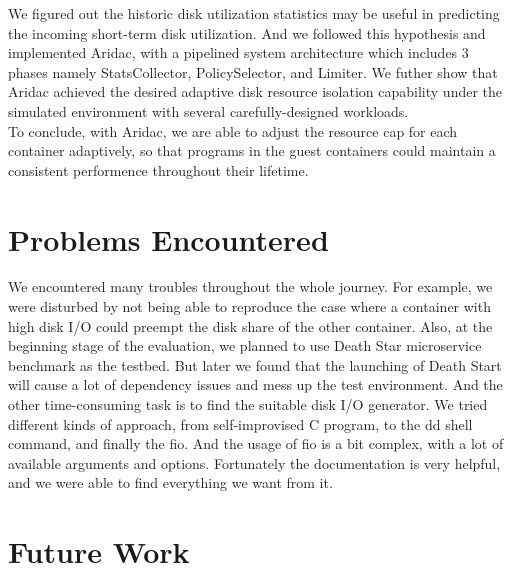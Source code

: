 \documentclass[10pt, conference,compsoc]{IEEEtran}
\begin{document}
We figured out the historic disk utilization statistics may be useful in predicting the incoming short-term disk utilization. And we followed this hypothesis and implemented Aridac, with a pipelined system architecture which includes 3 phases namely StatsCollector, PolicySelector, and Limiter. We futher show that Aridac achieved the desired adaptive disk resource isolation capability under the simulated environment with several carefully-designed workloads.\\

To conclude, with Aridac, we are able to adjust the resource cap for each container adaptively, so that programs in the guest containers could maintain a consistent performence throughout their lifetime.

\section{Problems Encountered}
We encountered many troubles throughout the whole journey. For example, we were disturbed by not being able to reproduce the case where a container with high disk I/O could preempt the disk share of the other container. Also, at the beginning stage of the evaluation, we planned to use Death Star microservice benchmark as the testbed. But later we found that the launching of Death Start will cause a lot of dependency issues and mess up the test environment. And the other time-consuming task is to find the suitable disk I/O generator. We tried different kinds of approach, from self-improvised C program, to the dd shell command, and finally the fio. And the usage of fio is a bit complex, with a lot of available arguments and options. Fortunately the documentation is very helpful, and we were able to find everything we want from it.\\

\section{Future Work}

\end{document}
